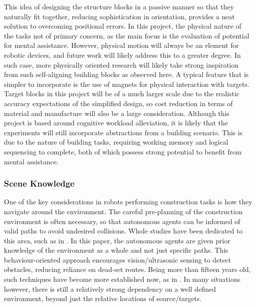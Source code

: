 \documentclass[11pt]{article}
\begin{document}
\pagebreak
This idea of designing the structure blocks in a passive manner so that they naturally fit together, reducing sophistication in orientation, provides a neat solution to overcoming positional errors. In this project, the physical nature of the tasks not of primary concern, as the main focus is the evaluation of potential for mental assistance. However, physical motion will always be an element for robotic devices, and future work will likely address this to a greater degree. In such case, more physically oriented research will likely take strong inspiration from such self-aligning building blocks as observed here. A typical feature that is simpler to incorporate is the use of magnets for physical interaction with targets. Target blocks in this project will be of a much larger scale due to the realistic accuracy expectations of the simplified design, so cost reduction in terms of material and manufacture will also be a large consideration. Although this project is based around cognitive workload alleviation, it is likely that the experiments will still incorporate abstractions from a building scenario. This is due to the nature of building tasks, requiring working memory and logical sequencing to complete, both of which possess strong potential to benefit from mental assistance.


\subsubsection{Scene Knowledge}
One of the key considerations in robots performing construction tasks is how they navigate around the environment. The careful pre-planning of the construction environment is often necessary, so that autonomous agents can be informed of valid paths to avoid undesired collisions. Whole studies have been dedicated to this area, such as in \cite{Arkin1990}. In this paper, the autonomous agents are given prior knowledge of the environment as a whole and not just specific paths. This behaviour-oriented approach encourages vision/ultrasonic sensing to detect obstacles, reducing reliance on dead-set routes. Being more than fifteen years old, such techniques have become more established now, as in \cite{Petersen2011}. In many situations however, there is still a relatively strong dependency on a well defined environment, beyond just the relative locations of source/targets.
\end{document}
